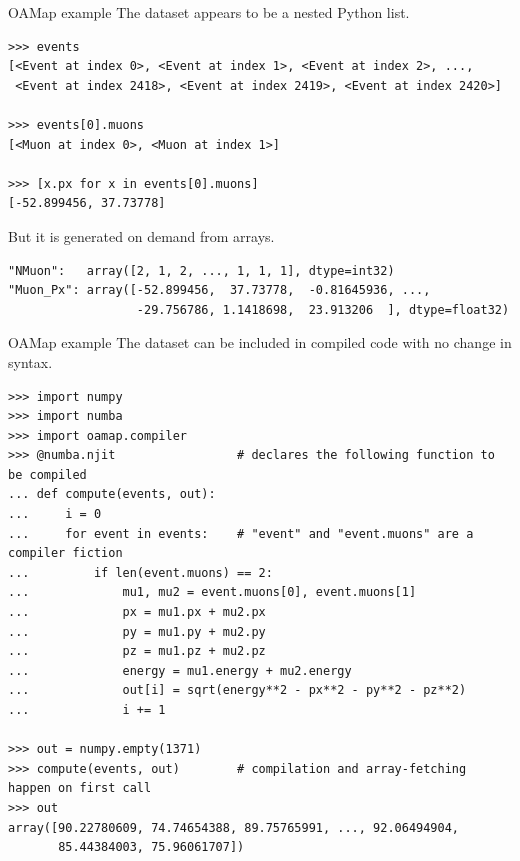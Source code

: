 \documentclass[aspectratio=169]{beamer}
\begin{document}
\begin{frame}[fragile]{OAMap example}
\vspace{0.5 cm}
\small
{\normalsize The dataset appears to be a nested Python list.}
\begin{verbatim}
>>> events
[<Event at index 0>, <Event at index 1>, <Event at index 2>, ...,
 <Event at index 2418>, <Event at index 2419>, <Event at index 2420>]

>>> events[0].muons
[<Muon at index 0>, <Muon at index 1>]

>>> [x.px for x in events[0].muons]
[-52.899456, 37.73778]
\end{verbatim}

\vspace{0.5 cm}
{\normalsize But it is generated on demand from arrays.}
\begin{verbatim}
"NMuon":   array([2, 1, 2, ..., 1, 1, 1], dtype=int32)
"Muon_Px": array([-52.899456,  37.73778,  -0.81645936, ...,
                  -29.756786, 1.1418698,  23.913206  ], dtype=float32)
\end{verbatim}
\end{frame}

\begin{frame}[fragile]{OAMap example}
\vspace{0.5 cm}
\scriptsize
{\normalsize The dataset can be included in compiled code with no change in syntax.}
\begin{verbatim}
>>> import numpy
>>> import numba
>>> import oamap.compiler
>>> @numba.njit                 # declares the following function to be compiled
... def compute(events, out):
...     i = 0
...     for event in events:    # "event" and "event.muons" are a compiler fiction
...         if len(event.muons) == 2:
...             mu1, mu2 = event.muons[0], event.muons[1]
...             px = mu1.px + mu2.px
...             py = mu1.py + mu2.py
...             pz = mu1.pz + mu2.pz
...             energy = mu1.energy + mu2.energy
...             out[i] = sqrt(energy**2 - px**2 - py**2 - pz**2)
...             i += 1

>>> out = numpy.empty(1371)
>>> compute(events, out)        # compilation and array-fetching happen on first call
>>> out
array([90.22780609, 74.74654388, 89.75765991, ..., 92.06494904,
       85.44384003, 75.96061707])
\end{verbatim}
\end{frame}
\end{document}
